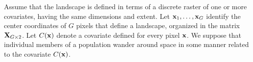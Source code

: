 Assume that the landscape is defined in terms of a discrete raster of
one or more covariates, having the same dimensions and extent.  Let
${\bf x}_{1},\ldots,{\bf x}_{G}$ identify the center coordinates of
$G$ pixels that define a landscape, organized in the 
 matrix ${\bf X}_{G \times 2}$.  Let $C({\bf x})$ denote a
covariate defined for every pixel ${\bf x}$.  We suppose
that individual members of a population wander around space in some
manner related to the covariate $C({\bf x})$.



